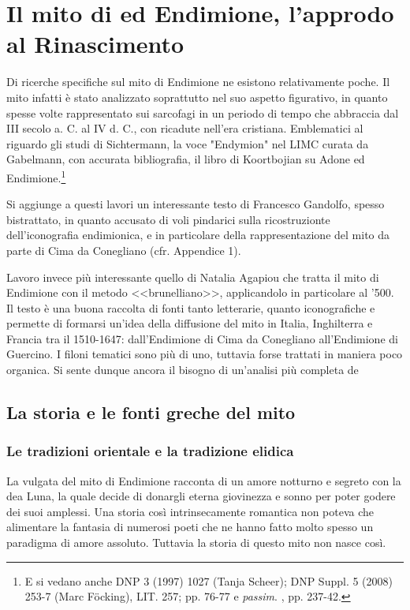 \documentclass[12pt,a4paper,openright, oneside]{book}
\begin{document}
\chapter{Il mito di ed Endimione, l'approdo al Rinascimento}
Di ricerche specifiche sul mito di Endimione ne esistono relativamente poche.  Il mito infatti è stato analizzato soprattutto nel suo aspetto figurativo, in quanto spesse volte rappresentato sui sarcofagi in un periodo di tempo che abbraccia dal III secolo a. C.  al IV d. C., con ricadute nell'era cristiana. Emblematici al riguardo gli studi di Sichtermann, la voce "Endymion" nel LIMC curata da Gabelmann, con accurata bibliografia, il libro di Koortbojian su Adone ed Endimione.\footnote{E si vedano anche DNP 3 (1997) 1027 (Tanja Scheer); DNP Suppl. 5 (2008) 253-7 (Marc F\"ocking), LIT. 257; \cite{Reinhardt} pp. 76-77 e \textit{passim}. \cite{Hans}, pp. 237-42.}

Si aggiunge a questi lavori un interessante testo di Francesco Gandolfo, spesso bistrattato, in quanto accusato di voli pindarici sulla ricostruzionte dell'iconografia endimionica, e in particolare della rappresentazione del mito da parte di Cima da Conegliano (cfr. Appendice 1). 

Lavoro invece più interessante quello di Natalia Agapiou che tratta il mito di Endimione con il metodo <<brunelliano>>, applicandolo in particolare al '500.  Il testo è una buona raccolta di fonti tanto letterarie, quanto iconografiche e permette di formarsi un'idea della diffusione del mito in Italia, Inghilterra e Francia tra il 1510-1647: dall'Endimione di Cima da Conegliano all'Endimione di Guercino. I filoni tematici sono più di uno, tuttavia forse trattati in maniera poco organica. Si sente dunque ancora il bisogno di un'analisi più completa de

\section{La storia e le fonti greche del mito}
\subsection{Le tradizioni orientale e la tradizione elidica}
La vulgata del mito di Endimione racconta di un amore notturno e segreto con la dea Luna, la quale decide di donargli eterna giovinezza e sonno per poter godere dei suoi amplessi. Una storia così intrinsecamente romantica non poteva che alimentare la fantasia di numerosi poeti che ne hanno fatto molto spesso un paradigma di amore assoluto. Tuttavia la storia di questo mito non nasce così.
\end{document}
